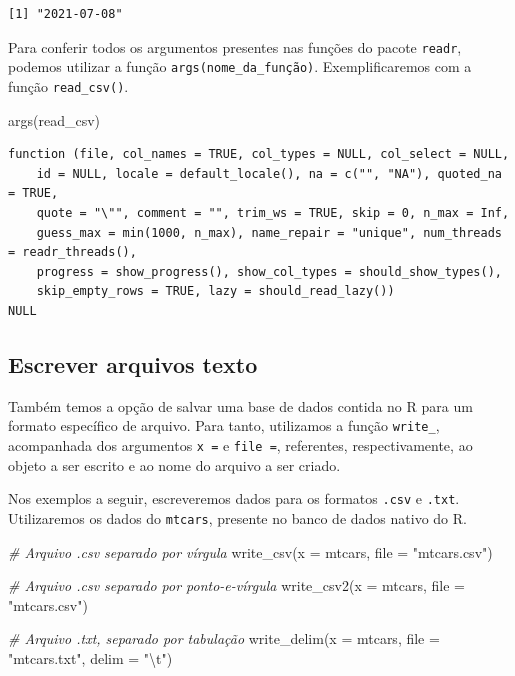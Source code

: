 \documentclass[
  brazilian,
]{book}
\newenvironment{Shaded}{\begin{snugshade}}{\end{snugshade}}
\newcommand{\AttributeTok}[1]{\textcolor[rgb]{0.77,0.63,0.00}{#1}}
\newcommand{\CommentTok}[1]{\textcolor[rgb]{0.56,0.35,0.01}{\textit{#1}}}
\newcommand{\FunctionTok}[1]{\textcolor[rgb]{0.00,0.00,0.00}{#1}}
\newcommand{\NormalTok}[1]{#1}
\newcommand{\SpecialCharTok}[1]{\textcolor[rgb]{0.00,0.00,0.00}{#1}}
\newcommand{\StringTok}[1]{\textcolor[rgb]{0.31,0.60,0.02}{#1}}
\begin{document}
\begin{verbatim}
[1] "2021-07-08"
\end{verbatim}

Para conferir todos os argumentos presentes nas funções do pacote \texttt{readr}, podemos utilizar a função \texttt{args(nome\_da\_função)}. Exemplificaremos com a função \texttt{read\_csv()}.

\begin{Shaded}
\begin{Highlighting}[]
\FunctionTok{args}\NormalTok{(read\_csv)}
\end{Highlighting}
\end{Shaded}

\begin{verbatim}
function (file, col_names = TRUE, col_types = NULL, col_select = NULL, 
    id = NULL, locale = default_locale(), na = c("", "NA"), quoted_na = TRUE, 
    quote = "\"", comment = "", trim_ws = TRUE, skip = 0, n_max = Inf, 
    guess_max = min(1000, n_max), name_repair = "unique", num_threads = readr_threads(), 
    progress = show_progress(), show_col_types = should_show_types(), 
    skip_empty_rows = TRUE, lazy = should_read_lazy()) 
NULL
\end{verbatim}

\hypertarget{escrever-arquivos-texto}{%
\subsection{Escrever arquivos texto}\label{escrever-arquivos-texto}}

Também temos a opção de salvar uma base de dados contida no R para um formato específico de arquivo. Para tanto, utilizamos a função \texttt{write\_}, acompanhada dos argumentos \texttt{x\ =} e \texttt{file\ =}, referentes, respectivamente, ao objeto a ser escrito e ao nome do arquivo a ser criado.

Nos exemplos a seguir, escreveremos dados para os formatos \texttt{.csv} e \texttt{.txt}. Utilizaremos os dados do \texttt{mtcars}, presente no banco de dados nativo do R.

\begin{Shaded}
\begin{Highlighting}[]
\CommentTok{\# Arquivo .csv separado por vírgula}
\FunctionTok{write\_csv}\NormalTok{(}\AttributeTok{x =}\NormalTok{ mtcars, }\AttributeTok{file =} \StringTok{"mtcars.csv"}\NormalTok{)}

\CommentTok{\# Arquivo .csv separado por ponto{-}e{-}vírgula}
\FunctionTok{write\_csv2}\NormalTok{(}\AttributeTok{x =}\NormalTok{ mtcars, }\AttributeTok{file =} \StringTok{"mtcars.csv"}\NormalTok{)}

\CommentTok{\# Arquivo .txt, separado por tabulação}
\FunctionTok{write\_delim}\NormalTok{(}\AttributeTok{x =}\NormalTok{ mtcars, }\AttributeTok{file =} \StringTok{"mtcars.txt"}\NormalTok{, }\AttributeTok{delim =} \StringTok{"}\SpecialCharTok{\textbackslash{}t}\StringTok{"}\NormalTok{)}
\end{Highlighting}
\end{Shaded}
\end{document}
